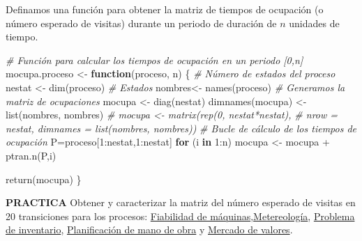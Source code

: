 \documentclass[
]{book}
\newenvironment{Shaded}{\begin{snugshade}}{\end{snugshade}}
\newcommand{\CommentTok}[1]{\textcolor[rgb]{0.56,0.35,0.01}{\textit{#1}}}
\newcommand{\ControlFlowTok}[1]{\textcolor[rgb]{0.13,0.29,0.53}{\textbf{#1}}}
\newcommand{\DecValTok}[1]{\textcolor[rgb]{0.00,0.00,0.81}{#1}}
\newcommand{\FunctionTok}[1]{\textcolor[rgb]{0.00,0.00,0.00}{#1}}
\newcommand{\NormalTok}[1]{#1}
\newcommand{\OtherTok}[1]{\textcolor[rgb]{0.56,0.35,0.01}{#1}}
\newcommand{\SpecialCharTok}[1]{\textcolor[rgb]{0.00,0.00,0.00}{#1}}
\newenvironment{bluebox}{
  \definecolor{shadecolor}{rgb}{176, 196, 222}  
  \color{black}
  \begin{shaded}}
 {\end{shaded}}
\newenvironment{whitebox}{
  \definecolor{shadecolor}{rgb}{255, 255, 255}  
  \color{black}
  \begin{shaded}}
 {\end{shaded}}
\theoremstyle{definition}
\theoremstyle{definition}
\theoremstyle{definition}
\theoremstyle{definition}
\theoremstyle{remark}
\begin{document}
\begin{whitebox}

Definamos una función para obtener la matriz de tiempos de ocupación (o número esperado de visitas) durante un periodo de duración de \(n\) unidades de tiempo.

\begin{Shaded}
\begin{Highlighting}[]
\CommentTok{\# Función para calcular los tiempos de ocupación en un periodo [0,n]}
\NormalTok{mocupa.proceso }\OtherTok{\textless{}{-}} \ControlFlowTok{function}\NormalTok{(proceso, n)}
\NormalTok{\{}
  \CommentTok{\# Número de estados del proceso}
\NormalTok{  nestat }\OtherTok{\textless{}{-}} \FunctionTok{dim}\NormalTok{(proceso)}
  \CommentTok{\# Estados}
\NormalTok{  nombres}\OtherTok{\textless{}{-}} \FunctionTok{names}\NormalTok{(proceso)}
  \CommentTok{\# Generamos la matriz de ocupaciones}
\NormalTok{  mocupa }\OtherTok{\textless{}{-}} \FunctionTok{diag}\NormalTok{(nestat)}
  \FunctionTok{dimnames}\NormalTok{(mocupa) }\OtherTok{\textless{}{-}} \FunctionTok{list}\NormalTok{(nombres, nombres)}
\CommentTok{\#  mocupa \textless{}{-} matrix(rep(0, nestat*nestat),}
\CommentTok{\#                 nrow = nestat, dimnames = list(nombres, nombres))}
  \CommentTok{\# Bucle de cálculo de los tiempos de ocupación}
\NormalTok{  P}\OtherTok{=}\NormalTok{proceso[}\DecValTok{1}\SpecialCharTok{:}\NormalTok{nestat,}\DecValTok{1}\SpecialCharTok{:}\NormalTok{nestat]}
  \ControlFlowTok{for}\NormalTok{ (i }\ControlFlowTok{in} \DecValTok{1}\SpecialCharTok{:}\NormalTok{n)}
\NormalTok{   mocupa }\OtherTok{\textless{}{-}}\NormalTok{ mocupa }\SpecialCharTok{+} \FunctionTok{ptran.n}\NormalTok{(P,i)}
  
  \FunctionTok{return}\NormalTok{(mocupa)}
\NormalTok{\}}
\end{Highlighting}
\end{Shaded}

\end{whitebox}

\begin{bluebox}
\textbf{PRACTICA} Obtener y caracterizar la matriz del número esperado de visitas en 20 transiciones para los procesos: \protect\hyperlink{fiabilidad}{Fiabilidad de máquinas},\protect\hyperlink{meteo}{Metereología}, \protect\hyperlink{inventario}{Problema de inventario}, \protect\hyperlink{planificacion}{Planificación de mano de obra} y \protect\hyperlink{mercadovalores}{Mercado de valores}.

\end{bluebox}
\end{document}
